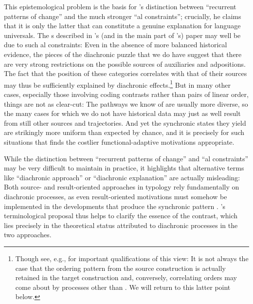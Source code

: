 \documentclass[output=paper]{langsci/langscibook}
\begin{document}
This epistemological problem is the basis for ’s distinction between “recurrent patterns of change” and the much stronger “al constraints”; crucially, he claims that it is only the latter that can constitute a genuine explanation for language universals. The s described in ’s (and in the main part of ’s) paper may well be due to such al constraints: Even in the absence of more balanced historical evidence, the pieces of the diachronic puzzle that we do have suggest that there are very strong restrictions on the possible sources of auxiliaries and adpositions. The fact that the position of these categories correlates with that of their sources may thus be sufficiently explained by diachronic  effects.\footnote{Though see, e.g., \citet[210--215]{Harris1995_Hist} for important qualifications of this view: It is not always the case that the ordering pattern from the source construction is actually retained in the target construction and, conversely, correlating orders may come about by processes other than . We will return to this latter point below.} But in many other cases, especially those involving coding contrasts rather than pairs of linear order, things are not as clear-cut: The pathways we know of are usually more diverse, so the many cases for which we do not have historical data may just as well result from still other sources and trajectories. And yet the synchronic states they yield are strikingly more uniform than expected by chance, and it is precisely for such situations that  finds the costlier functional-adaptive motivations appropriate.

\largerpage
While the distinction between “recurrent patterns of change” and “al constraints” may be very difficult to maintain in practice, it highlights that alternative terms like “diachronic approach” or “diachronic explanation” are actually misleading: Both source- and result-oriented approaches in typology rely fundamentally on diachronic processes, as even result-oriented motivations must somehow be implemented in the developments that produce the synchronic pattern \citep{Haspelmath1999_Opt}. ’s terminological proposal thus helps to clarify the essence of the contrast, which lies precisely in the theoretical status attributed to diachronic processes in the two approaches. 
\end{document}
